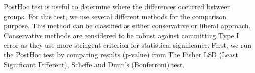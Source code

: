 \documentclass[11pt,oneside,a4paper]{reedthesis}
\newenvironment{Shaded}{\begin{snugshade}}{\end{snugshade}}
\newcommand{\KeywordTok}[1]{\textcolor[rgb]{0.13,0.29,0.53}{\textbf{#1}}}
\newcommand{\DataTypeTok}[1]{\textcolor[rgb]{0.13,0.29,0.53}{#1}}
\newcommand{\StringTok}[1]{\textcolor[rgb]{0.31,0.60,0.02}{#1}}
\newcommand{\CommentTok}[1]{\textcolor[rgb]{0.56,0.35,0.01}{\textit{#1}}}
\newcommand{\OperatorTok}[1]{\textcolor[rgb]{0.81,0.36,0.00}{\textbf{#1}}}
\newcommand{\NormalTok}[1]{#1}
\begin{document}
PostHoc test is useful to determine where the differences occurred
between groups. For this test, we use several different methods for the
comparison purpose. This method can be classified as either conservative
or liberal approach. Conservative methods are considered to be robust
against committing Type I error as they use more stringent criterion for
statistical significance. First, we run the PostHoc test by comparing
results (p-value) from The Fisher LSD (Least Significant Different),
Scheffe and Dunn's (Bonferroni) test.
\begin{Shaded}
\end{Shaded}
\end{document}
